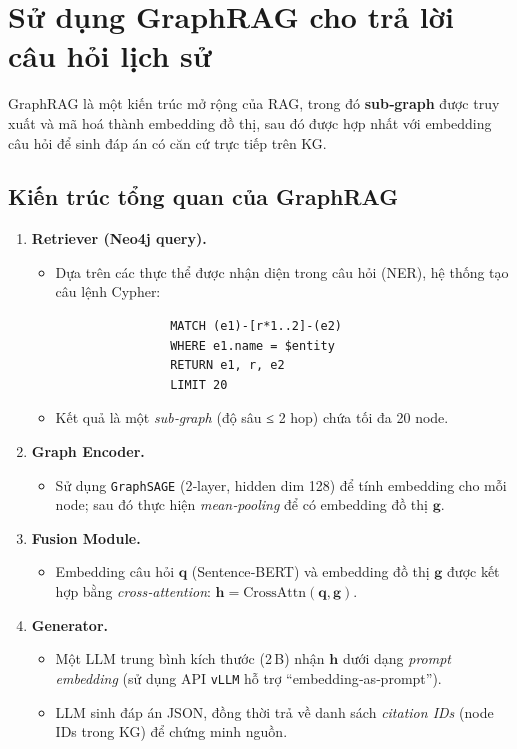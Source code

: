 \section{Sử dụng GraphRAG cho trả lời câu hỏi lịch sử}

\label{sec:graphrag}
GraphRAG là một kiến trúc mở rộng của RAG, trong đó \textbf{sub‑graph} được truy xuất và mã hoá thành embedding đồ thị, sau đó được hợp nhất với embedding câu hỏi để sinh đáp án có căn cứ trực tiếp trên KG.
\subsection{Kiến trúc tổng quan của GraphRAG}
\label{subsec:graphrag_overview}
\begin{enumerate}
  \item \textbf{Retriever (Neo4j query).}  
        \begin{itemize}
          \item Dựa trên các thực thể được nhận diện trong câu hỏi (NER), hệ thống tạo câu lệnh Cypher:  
                \begin{verbatim}
                MATCH (e1)-[r*1..2]-(e2)
                WHERE e1.name = $entity
                RETURN e1, r, e2
                LIMIT 20
                \end{verbatim}
          \item Kết quả là một \textit{sub‑graph} (độ sâu ≤ 2 hop) chứa tối đa 20 node.
        \end{itemize}
  \item \textbf{Graph Encoder.}  
        \begin{itemize}
          \item Sử dụng \texttt{GraphSAGE} (2‑layer, hidden dim 128) để tính embedding cho mỗi node; sau đó thực hiện \textit{mean‑pooling} để có embedding đồ thị $\mathbf{g}$.
        \end{itemize}
  \item \textbf{Fusion Module.}  
        \begin{itemize}
          \item Embedding câu hỏi $\mathbf{q}$ (Sentence‑BERT) và embedding đồ thị $\mathbf{g}$ được kết hợp bằng \textit{cross‑attention}:  
                $\mathbf{h}= \text{CrossAttn}(\mathbf{q},\mathbf{g})$.
        \end{itemize}
  \item \textbf{Generator.}  
        \begin{itemize}
          \item Một LLM trung bình kích thước (2 B) nhận $\mathbf{h}$ dưới dạng \textit{prompt embedding} (sử dụng API \texttt{vLLM} hỗ trợ ``embedding‑as‑prompt'').  
          \item LLM sinh đáp án JSON, đồng thời trả về danh sách \textit{citation IDs} (node IDs trong KG) để chứng minh nguồn.
        \end{itemize}
\end{enumerate}
